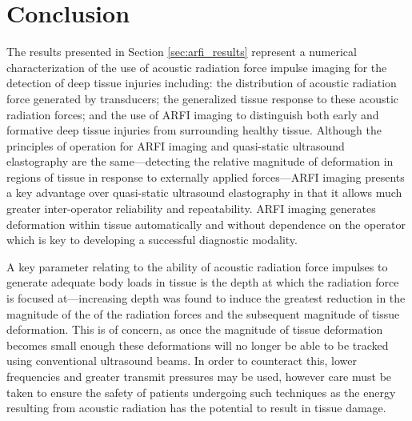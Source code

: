 	\section{Conclusion}
		The results presented in Section \ref{sec:arfi_results} represent a numerical characterization of the use of acoustic radiation force impulse imaging for the detection of deep tissue injuries including: the distribution of acoustic radiation force generated by transducers; the generalized tissue response to these acoustic radiation forces; and the use of ARFI imaging to distinguish both early and formative deep tissue injuries from surrounding healthy tissue. Although the principles of operation for ARFI imaging and quasi-static ultrasound elastography are the same---detecting the relative magnitude of deformation in regions of tissue in response to externally applied forces---ARFI imaging presents a key advantage over quasi-static ultrasound elastography in that it allows much greater inter-operator reliability and repeatability. ARFI imaging generates deformation within tissue automatically and without dependence on the operator which is key to developing a successful diagnostic modality.

		A key parameter relating to the ability of acoustic radiation force impulses to generate adequate body loads in tissue is the depth at which the radiation force is focused at---increasing depth was found to induce the greatest reduction in the magnitude of the of the radiation forces and the subsequent magnitude of tissue deformation. This is of concern, as once the magnitude of tissue deformation becomes small enough these deformations will no longer be able to be tracked using conventional ultrasound beams. In order to counteract this, lower frequencies and greater transmit pressures may be used, however care must be taken to ensure the safety of patients undergoing such techniques as the energy resulting from acoustic radiation has the potential to result in tissue damage.


